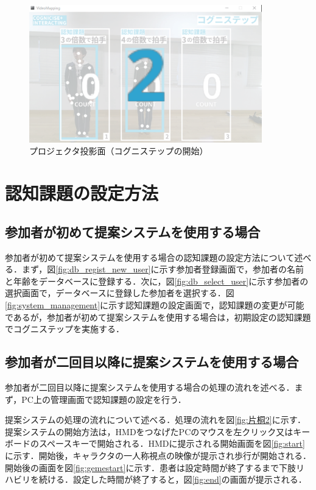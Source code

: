 \begin{figure}[tbp]
	\centering
			\includegraphics[width=0.9\textwidth]{chap2-figure/vm_start.eps}
	\caption{プロジェクタ投影面（コグニステップの開始）}
	\label{fig:vm_start}
\end{figure}
\fi

\section{認知課題の設定方法}
\subsection{参加者が初めて提案システムを使用する場合}
参加者が初めて提案システムを使用する場合の認知課題の設定方法について述べる．まず，図\ref{fig:db_regist_new_user}に示す参加者登録画面で，参加者の名前と年齢をデータベースに登録する．次に，図\ref{fig:db_select_user}に示す参加者の選択画面で，データベースに登録した参加者を選択する．図\ref{fig:system_management}に示す認知課題の設定画面で，認知課題の変更が可能であるが，参加者が初めて提案システムを使用する場合は，初期設定の認知課題でコグニステップを実施する．

\subsection{参加者が二回目以降に提案システムを使用する場合}
参加者が二回目以降に提案システムを使用する場合の処理の流れを述べる．まず，PC上の管理画面で認知課題の設定を行う．


提案システムの処理の流れについて述べる．処理の流れを図\ref{fig:片桐2}に示す．
提案システムの開始方法は，HMDをつなげたPCのマウスを左クリック又はキーボードのスペースキーで開始される．HMDに提示される開始画面を図\ref{fig:start}に示す．開始後，キャラクタの一人称視点の映像が提示され歩行が開始される．開始後の画面を図\ref{fig:gemestart}に示す．患者は設定時間が終了するまで下肢リハビリを続ける．設定した時間が終了すると，図\ref{fig:end}の画面が提示される．
\fi

